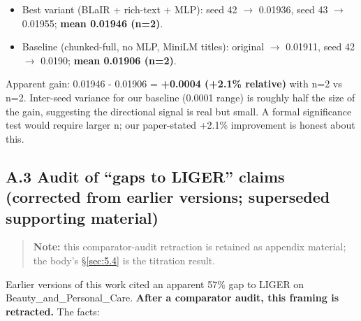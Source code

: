 \begin{itemize}
\tightlist
\item
  Best variant (BLaIR + rich-text + MLP): seed 42 \ensuremath{\rightarrow} 0.01936, seed 43 \ensuremath{\rightarrow} 0.01955; \textbf{mean 0.01946 (n=2)}.
\item
  Baseline (chunked-full, no MLP, MiniLM titles): original \ensuremath{\rightarrow} 0.01911, seed 42 \ensuremath{\rightarrow} 0.0190; \textbf{mean 0.01906 (n=2)}.
\end{itemize}

Apparent gain: 0.01946 - 0.01906 = \textbf{+0.0004 (+2.1\% relative)} with n=2 vs n=2. Inter-seed variance for our baseline (0.0001 range) is roughly half the size of the gain, suggesting the directional signal is real but small. A formal significance test would require larger n; our paper-stated +2.1\% improvement is honest about this.


\subsection*{A.3 Audit of ``gaps to LIGER'' claims (corrected from earlier versions; superseded supporting material)}

\begin{quote}
\textbf{Note:} this comparator-audit retraction is retained as appendix material; the body's \S\ref{sec:5.4} is the titration result.
\end{quote}

Earlier versions of this work cited an apparent 57\% gap to LIGER on Beauty\_and\_\allowbreak Personal\_Care. \textbf{After a comparator audit, this framing is retracted.} The facts:

